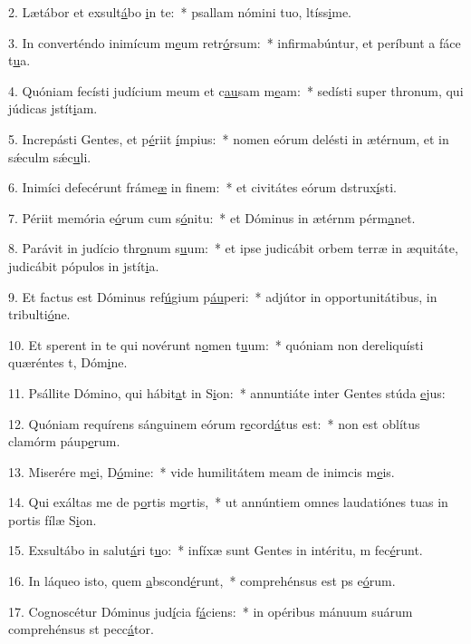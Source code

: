 2. Lætábor et exsult\uline{á}bo \uline{i}n te:~* psallam nómini tuo, ltíss\uline{i}me.\par 
3. In converténdo inimícum m\uline{e}um retr\uline{ó}rsum:~* infirmabúntur, et períbunt a fáce t\uline{u}a.\par 
4. Quóniam fecísti judícium meum et c\uline{au}sam m\uline{e}am:~* sedísti super thronum, qui júdicas jstít\uline{i}am.\par 
5. Increpásti Gentes, et p\uline{é}riit \uline{í}mpius:~* nomen eórum delésti in ætérnum, et in sǽculm sǽc\uline{u}li.\par 
6. Inimíci defecérunt fráme\uline{æ} in f\uline{i}nem:~* et civitátes eórum dstrux\uline{í}sti.\par 
7. Périit memória e\uline{ó}rum cum s\uline{ó}nitu:~* et Dóminus in ætérnm pérm\uline{a}net.\par 
8. Parávit in judício thr\uline{o}num s\uline{u}um:~* et ipse judicábit orbem terræ in æquitáte, judicábit pópulos in jstít\uline{i}a.\par 
9. Et factus est Dóminus ref\uline{ú}gium p\uline{áu}peri:~* adjútor in opportunitátibus, in tribulti\uline{ó}ne.\par 
10. Et sperent in te qui novérunt n\uline{o}men t\uline{u}um:~* quóniam non dereliquísti quæréntes t, Dóm\uline{i}ne.\par 
11. Psállite Dómino, qui hábit\uline{a}t in S\uline{i}on:~* annuntiáte inter Gentes stúda \uline{e}jus:\par 
12. Quóniam requírens sánguinem eórum r\uline{e}cord\uline{á}tus est:~* non est oblítus clamórm páup\uline{e}rum.\par 
13. Miserére m\uline{e}i, D\uline{ó}mine:~* vide humilitátem meam de inimcis m\uline{e}is.\par 
14. Qui exáltas me de p\uline{o}rtis m\uline{o}rtis,~* ut annúntiem omnes laudatiónes tuas in portis fílæ S\uline{i}on.\par 
15. Exsultábo in salut\uline{á}ri t\uline{u}o:~* infíxæ sunt Gentes in intéritu, m fec\uline{é}runt.\par 
16. In láqueo isto, quem \uline{a}bscond\uline{é}runt,~* comprehénsus est ps e\uline{ó}rum.\par 
17. Cognoscétur Dóminus jud\uline{í}cia f\uline{á}ciens:~* in opéribus mánuum suárum comprehénsus st pecc\uline{á}tor.\par 
